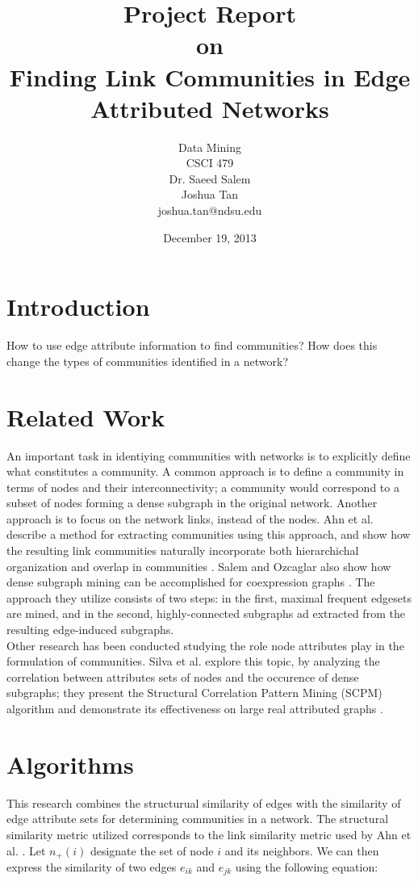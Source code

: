 \documentclass{report} %
\title{Project Report\\[0.5em]{\Large on}\\[0.5em]Finding Link Communities in Edge Attributed Networks}
\author{Data Mining\\CSCI 479\\Dr. Saeed Salem\\[1em] Joshua Tan\\joshua.tan@ndsu.edu}
\date{December 19, 2013}
\begin{document}
\maketitle

\section*{Introduction}


How to use edge attribute information to find communities? How does this change the types of communities identified in a network?

\section*{Related Work}

An important task in identiying communities with networks is to explicitly define what constitutes a community. A common approach is to define a community in terms of nodes and their interconnectivity; a community would correspond to a subset of nodes forming a dense subgraph in the original network. Another approach is to focus on the network links, instead of the nodes. Ahn et al. describe a method for extracting communities using this approach, and show how the resulting link communities naturally incorporate both hierarchichal organization and overlap in communities \cite{ahn-lehmann-link-communities-nature-2010}. Salem and Ozcaglar also show how dense subgraph mining can be accomplished for coexpression graphs \cite{Salem:2013:MMF:2500863.2500869}. The approach they utilize consists of two steps: in the first, maximal frequent edgesets are mined, and in the second, highly-connected subgraphs ad extracted from the resulting edge-induced subgraphs.\\

Other research has been conducted studying the role node attributes play in the formulation of communities. Silva et al. explore this topic, by analyzing the correlation between attributes sets of nodes and the occurence of dense subgraphs; they present the Structural Correlation Pattern Mining (SCPM) algorithm and demonstrate its effectiveness on large real attributed graphs \cite{DBLP:journals/corr/abs-1201-6568}.

\section*{Algorithms}

This research combines the structurual similarity of edges with the similarity of edge attribute sets for determining communities in a network. The structural similarity metric utilized corresponds to the link similarity metric used by Ahn et al. \cite{ahn-lehmann-link-communities-nature-2010}. Let $n_+(i)$ designate the set of node $i$ and its neighbors. We can then express the similarity of two edges $e_{ik}$ and $e_{jk}$ using the following equation:
\end{document}
